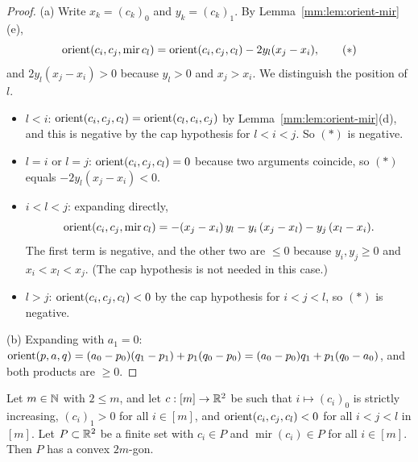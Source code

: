 \begin{proof}
(a) Write $x_k=(c_k)_0$ and $y_k=(c_k)_1$. By Lemma~\ref{mm:lem:orient-mir}(e),
\[ \operatorname{orient}(c_i,c_j,\operatorname{mir}c_l)=\operatorname{orient}(c_i,c_j,c_l)-2y_l(x_j-x_i), \tag{$*$} \]
and $2y_l(x_j-x_i)>0$ because $y_l>0$ and $x_j>x_i$. We distinguish the position of $l$.
\begin{itemize}
\item $l<i$: $\operatorname{orient}(c_i,c_j,c_l)=\operatorname{orient}(c_l,c_i,c_j)$ by Lemma~\ref{mm:lem:orient-mir}(d), and this is
  negative by the cap hypothesis for $l<i<j$. So $(*)$ is negative.
\item $l=i$ or $l=j$: $\operatorname{orient}(c_i,c_j,c_l)=0$ because two arguments coincide, so $(*)$ equals
  $-2y_l(x_j-x_i)<0$.
\item $i<l<j$: expanding directly,
  \[ \operatorname{orient}(c_i,c_j,\operatorname{mir}c_l)=-(x_j-x_i)\,y_l-y_i\,(x_j-x_l)-y_j\,(x_l-x_i). \]
  The first term is negative, and the other two are $\le0$ because $y_i,y_j\ge0$ and $x_i<x_l<x_j$.
  (The cap hypothesis is not needed in this case.)
\item $l>j$: $\operatorname{orient}(c_i,c_j,c_l)<0$ by the cap hypothesis for $i<j<l$, so $(*)$ is negative.
\end{itemize}
(b) Expanding with $a_1=0$:
$\operatorname{orient}(p,a,q)=(a_0-p_0)(q_1-p_1)+p_1(q_0-p_0)=(a_0-p_0)q_1+p_1(q_0-a_0)$, and both products are $\ge0$.
\end{proof}

\begin{theorem}\label{mm:thm:mirror-polygon}
Let $m\in\mathbb N$ with $2\le m$, and let $c:[m]\to\mathbb R^2$ be such that $i\mapsto(c_i)_0$ is strictly increasing,
$(c_i)_1>0$ for all $i\in[m]$, and $\operatorname{orient}(c_i,c_j,c_l)<0$ for all $i<j<l$ in $[m]$. Let $P\subset\mathbb R^2$
be a finite set with $c_i\in P$ and $\operatorname{mir}(c_i)\in P$ for all $i\in[m]$. Then $P$ has a
convex $2m$-gon.
\end{theorem}

